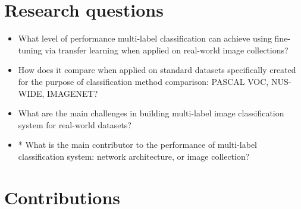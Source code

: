 \section{Research questions}
\begin{itemize}
    \item What level of performance multi-label classification can achieve using fine-tuning via transfer learning when applied on real-world image collections?
    \item How does it compare when applied on standard datasets specifically created for the purpose of classification method comparison: PASCAL VOC, NUS-WIDE, IMAGENET?
    \item What are the main challenges in building multi-label image classification system for real-world datasets?
    \item * What is the main contributor to the performance of multi-label classification system: network architecture, or image collection?
\end{itemize}


\section{Contributions}
